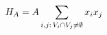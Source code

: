 \documentclass[preview]{standalone}
\begin{document}
\begin{align*}
\special{dvisvgm:raw <g id='unique000'>}H_A = A \sum_{i,j:\, V_i \cap V_j \neq \emptyset} x_i x_j\special{dvisvgm:raw </g>}
\end{align*}
\end{document}

